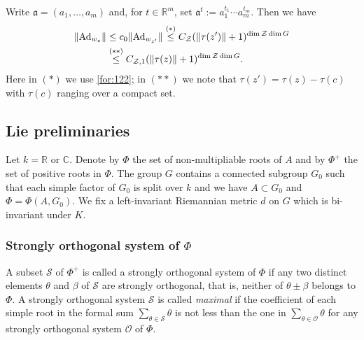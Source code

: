 \documentclass[11 pt]{amsart}
\newcommand{\RR}{\mathbb{R}}
\newcommand{\CC}{\mathbb{C}}
\newcommand{\norm}[1]{\lVert#1\rVert}
\theoremstyle{definition}
\numberwithin{equation}{section}
\begin{document}
 Write $\mathfrak{a}=(a_1,\dots,a_{m})$ and, for $t\in\RR^m$, set $\mathfrak{a}^t := a_1^{t_1}\cdots a_{m}^{t_m}$.
Then we have
\begin{align}\label{for:127}
 \norm{\text{Ad}_{w_z}}&\leq c_0\norm{\text{Ad}_{w_{z'}}}\overset{(*)}{\leq} C_{\mathcal{Z}} (\norm{\tau(z')}+1)^{\dim \mathcal{Z}\dim G}\notag\\
 &\overset{(**)}{\leq} C_{\mathcal{Z},1} (\norm{\tau(z)}+1)^{\dim \mathcal{Z}\dim G}.
\end{align}
Here in $(*)$ we use \eqref{for:122}; in $(**)$ we note that $\tau(z')=\tau(z)-\tau(c)$ with $\tau(c)$ ranging over a compact set.




\subsection{Lie preliminaries}\label{sec:36} Let $k=\RR$ or $\CC$.  Denote by $\Phi$ the set of non-multipliable roots of $A$ and by $\Phi^+$
the set of positive roots in $\Phi$.
The group $G$ contains a connected
subgroup $G_0$ such that each simple factor of $G_0$ is split over $k$ and we have $A\subset G_0$ and $\Phi=\Phi(A,  G_0)$. We fix a
left-invariant Riemannian metric $d$ on $G$ which is bi-invariant under $K$.



\subsubsection{Strongly orthogonal system of $\Phi$}\label{for:220}  A subset $\mathcal{S}$ of $\Phi^+$ is called a strongly orthogonal system
of $\Phi$ if any two distinct elements $\theta$ and $\beta$ of $\mathcal{S}$ are strongly orthogonal, that is, neither
of $\theta\pm\beta$ belongs to $\Phi$. A strongly orthogonal system $\mathcal{S}$ is called \emph{maximal} if the coefficient of each simple
root in the formal sum $\sum_{\theta\in \mathcal{S}}\theta$ is not less than the one in
$\sum_{\theta\in \mathcal{O}}\theta$ for any strongly
orthogonal system $\mathcal{O}$ of $\Phi$.
\end{document}
